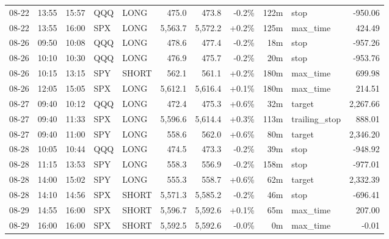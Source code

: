 \documentclass[11pt,a4paper,twoside]{article}
\begin{document}
\begin{center}
\begin{longtable}{>{\color{txtmain}}l l l l l r r r r >{\color{txtmain}}l r}
08-22 & 13:55 & 15:57 & QQQ & LONG & 475.0 & 473.8 & \textcolor{lossred}{-0.2\%} & 122m & stop & \textcolor{lossred}{-950.06} \\
08-22 & 13:55 & 16:00 & SPX & LONG & 5,563.7 & 5,572.2 & \textcolor{wingreen}{+0.2\%} & 125m & max\_time & \textcolor{wingreen}{424.49} \\
08-26 & 09:50 & 10:08 & QQQ & LONG & 478.6 & 477.4 & \textcolor{lossred}{-0.2\%} & 18m & stop & \textcolor{lossred}{-957.26} \\
08-26 & 10:10 & 10:30 & QQQ & LONG & 476.9 & 475.7 & \textcolor{lossred}{-0.2\%} & 20m & stop & \textcolor{lossred}{-953.76} \\
08-26 & 10:15 & 13:15 & SPY & SHORT & 562.1 & 561.1 & \textcolor{wingreen}{+0.2\%} & 180m & max\_time & \textcolor{wingreen}{699.98} \\
08-26 & 12:05 & 15:05 & SPX & LONG & 5,612.1 & 5,616.4 & \textcolor{wingreen}{+0.1\%} & 180m & max\_time & \textcolor{wingreen}{214.51} \\
08-27 & 09:40 & 10:12 & QQQ & LONG & 472.4 & 475.3 & \textcolor{wingreen}{+0.6\%} & 32m & target & \textcolor{wingreen}{2,267.66} \\
08-27 & 09:40 & 11:33 & SPX & LONG & 5,596.6 & 5,614.4 & \textcolor{wingreen}{+0.3\%} & 113m & trailing\_stop & \textcolor{wingreen}{888.01} \\
08-27 & 09:40 & 11:00 & SPY & LONG & 558.6 & 562.0 & \textcolor{wingreen}{+0.6\%} & 80m & target & \textcolor{wingreen}{2,346.20} \\
08-28 & 10:05 & 10:44 & QQQ & LONG & 474.5 & 473.3 & \textcolor{lossred}{-0.2\%} & 39m & stop & \textcolor{lossred}{-948.92} \\
08-28 & 11:15 & 13:53 & SPY & LONG & 558.3 & 556.9 & \textcolor{lossred}{-0.2\%} & 158m & stop & \textcolor{lossred}{-977.01} \\
08-28 & 14:00 & 15:02 & SPY & LONG & 555.3 & 558.7 & \textcolor{wingreen}{+0.6\%} & 62m & target & \textcolor{wingreen}{2,332.39} \\
08-28 & 14:10 & 14:56 & SPX & SHORT & 5,571.3 & 5,585.2 & \textcolor{lossred}{-0.2\%} & 46m & stop & \textcolor{lossred}{-696.41} \\
08-29 & 14:55 & 16:00 & SPX & SHORT & 5,596.7 & 5,592.6 & \textcolor{wingreen}{+0.1\%} & 65m & max\_time & \textcolor{wingreen}{207.00} \\
08-29 & 16:00 & 16:00 & SPX & SHORT & 5,592.5 & 5,592.6 & \textcolor{lossred}{-0.0\%} & 0m & max\_time & \textcolor{lossred}{-0.01} \\

\end{longtable}
\end{center}
\end{document}
